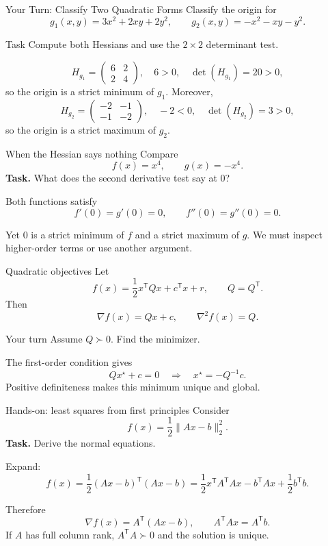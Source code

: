 \documentclass[aspectratio=169,11pt]{beamer}
\newcommand{\trans}{^{\mathsf T}}
\newcommand{\grad}{\nabla}
\begin{document}
\begin{frame}{Your Turn: Classify Two Quadratic Forms}
  Classify the origin for
  \[
    g_1(x,y)=3x^2+2xy+2y^2,
    \qquad
    g_2(x,y)=-x^2-xy-y^2.
  \]

  \begin{exampleblock}{Task}
    Compute both Hessians and use the $2\times2$ determinant test.
  \end{exampleblock}

  \pause
  \[
    H_{g_1}=\begin{pmatrix}6&2\\2&4\end{pmatrix},
    \quad 6>0,\quad \det(H_{g_1})=20>0,
  \]
  so the origin is a strict minimum of $g_1$. Moreover,
  \[
    H_{g_2}=\begin{pmatrix}-2&-1\\-1&-2\end{pmatrix},
    \quad -2<0,\quad \det(H_{g_2})=3>0,
  \]
  so the origin is a strict maximum of $g_2$.
\end{frame}

\begin{frame}{When the Hessian says nothing}
  Compare
  \[
    f(x)=x^4,
    \qquad
    g(x)=-x^4.
  \]
  \textbf{Task.} What does the second derivative test say at $0$?

  \pause
  Both functions satisfy
  \[
    f'(0)=g'(0)=0,
    \qquad
    f''(0)=g''(0)=0.
  \]

  \pause
  Yet $0$ is a strict minimum of $f$ and a strict maximum of $g$.
  We must inspect higher-order terms or use another argument.
\end{frame}

\begin{frame}{Quadratic objectives}
  Let
  \[
    f(x)=\frac12x\trans Qx+c\trans x+r,
    \qquad Q=Q\trans.
  \]
  Then
  \[
    \grad f(x)=Qx+c,
    \qquad
    \grad^2f(x)=Q.
  \]

  \begin{exampleblock}{Your turn}
    Assume $Q\succ0$. Find the minimizer.
  \end{exampleblock}

  \pause
  The first-order condition gives
  \[
    Qx^\star+c=0
    \quad\Longrightarrow\quad
    \boxed{x^\star=-Q^{-1}c.}
  \]
  Positive definiteness makes this minimum unique and global.
\end{frame}

\begin{frame}{Hands-on: least squares from first principles}
  Consider
  \[
    f(x)=\frac12\|Ax-b\|_2^2.
  \]
  \textbf{Task.} Derive the normal equations.

  \pause
  Expand:
  \[
    f(x)=\frac12(Ax-b)\trans(Ax-b)
    =\frac12x\trans A\trans Ax-b\trans Ax+\frac12b\trans b.
  \]

  \pause
  Therefore
  \[
    \grad f(x)=A\trans(Ax-b),
    \qquad
    \boxed{A\trans A x=A\trans b.}
  \]
  If $A$ has full column rank, $A\trans A\succ0$ and the solution is unique.
\end{frame}
\end{document}

